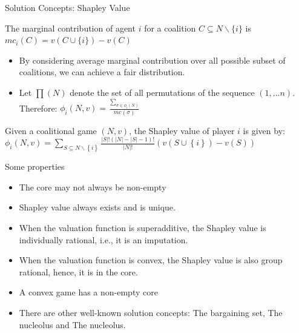 \documentclass{beamer}
\begin{document}
\begin{frame}{Solution Concepts: Shapley Value}
    \begin{definition} \label{dfn:marginalcontribution}
        The {\color{red}marginal contribution} of agent $i$ for a coalition $C \subseteq N \backslash \{i\}$ is $mc_i(C) = v(C \cup \{i\}) - v(C)$
    \end{definition}

    \begin{itemize}
        \item By considering average marginal contribution over all possible subset of coalitions, we can achieve a fair distribution.\\
        \item Let $\prod(N)$ denote the set of all permutations of the sequence $(1,...n)$. Therefore: $\phi_i(N,v) = \frac{\sum_{\sigma \in \phi_i(N)}}{mc(\sigma)}$
    \end{itemize}

    \begin{definition} \label{dfn:shapleyvalue}
        Given a coalitional game $(N,v)$, the Shapley value of player $i$ is given by: \\
        $\phi_i(N,v) = \sum_{S \subseteq N \backslash \left\{i\right\} } \frac{|S|! (|N|-|S|-1)!}{|N|!} (v(S \cup \left\{i\right\}) - v(S))$
    \end{definition}
\end{frame}
\begin{frame}{Some properties}
    \begin{itemize}
        \item The core may not always be non-empty
        \item Shapley value always exists and is unique.
        \item When the valuation function is {\color{red}superadditive}, the Shapley value is {\color{red}individually rational}, i.e., it is an imputation.
        \item When the valuation function is {\color{red}convex}, the Shapley value is also group rational, hence, it is in the {\color{red}core}.
        \item A convex game has a non-empty core
        \item There are other well-known solution concepts: The bargaining set, The nucleolus and The nucleolus.
    \end{itemize}
\end{frame}
\end{document}
